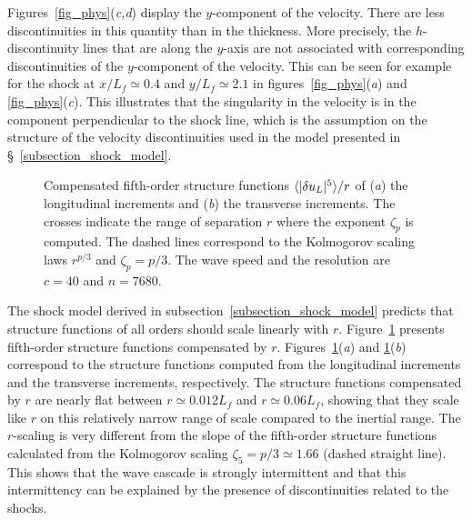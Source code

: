Figures~\ref{fig_phys}(\textit{c,d}) display the $y$-component of the
velocity.  There are less discontinuities in this quantity than in the
thickness. More precisely, the $h$-discontinuity lines that are along
the $y$-axis are not associated with corresponding discontinuities of
the $y$-component of the velocity. This can be seen for example for
the shock at $x/L_f\simeq 0.4$ and $y/L_f\simeq 2.1$ in
figures~\ref{fig_phys}(\textit{a}) and \ref{fig_phys}(\textit{c}).
%
This illustrates that the singularity in the velocity is in the
component perpendicular to the shock line, which is the assumption on
the structure of the velocity discontinuities used in the model
presented in \S~\ref{subsection_shock_model}.







\begin{figure}
\caption{
Compensated fifth-order structure functions $\langle |\delta u_L|^5 \rangle/r$ 
of (\textit{a}) the longitudinal increments and (\textit{b}) the
transverse increments. %
The crosses indicate the range of separation $r$ where the exponent
$\zeta_p$ is computed. %
The dashed lines correspond to the Kolmogorov scaling laws $r^{p/3}$
and $\zeta_p = p/3$.  The wave speed and the resolution are $c = 40$
and $n = 7680$.  }
\label{fig_strfct5}
\end{figure}


The shock model derived in subsection~\ref{subsection_shock_model}
predicts that structure functions of all orders should scale linearly
with $r$.
%
Figure~\ref{fig_strfct5} presents fifth-order structure functions
compensated by $r$.
%
Figures~\ref{fig_strfct5}(\textit{a}) and
\ref{fig_strfct5}(\textit{b}) correspond to the structure functions
computed from the longitudinal increments and the transverse
increments, respectively.  The structure functions compensated by $r$
are nearly flat between $r \simeq 0.012 L_f$ and $r \simeq 0.06 L_f$,
showing that they scale like $r$ on this relatively narrow range of
scale compared to the inertial range.
%
The $r$-scaling is very different from the slope of the fifth-order
structure functions calculated from the Kolmogorov scaling $\zeta_5 =
p/3 \simeq 1.66$ (dashed straight line).  This shows that the wave
cascade is strongly intermittent and that this intermittency can be
explained by the presence of discontinuities related to the shocks.




